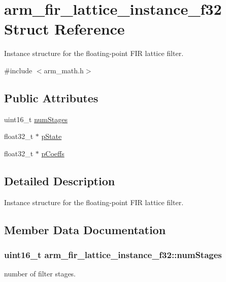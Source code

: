 \hypertarget{structarm__fir__lattice__instance__f32}{}\section{arm\+\_\+fir\+\_\+lattice\+\_\+instance\+\_\+f32 Struct Reference}
\label{structarm__fir__lattice__instance__f32}


Instance structure for the floating-\/point F\+IR lattice filter.  




{\ttfamily \#include $<$arm\+\_\+math.\+h$>$}

\subsection*{Public Attributes}
\begin{DoxyCompactItemize}
\item 
uint16\+\_\+t \hyperlink{structarm__fir__lattice__instance__f32_ad369bd9997a250f195254df37408a38f}{num\+Stages}
\item 
float32\+\_\+t $\ast$ \hyperlink{structarm__fir__lattice__instance__f32_ae348884a1ba9b83fadccd5da640cbcaf}{p\+State}
\item 
float32\+\_\+t $\ast$ \hyperlink{structarm__fir__lattice__instance__f32_a33bf5948c947f9ef80a99717cb0a0a43}{p\+Coeffs}
\end{DoxyCompactItemize}


\subsection{Detailed Description}
Instance structure for the floating-\/point F\+IR lattice filter. 

\subsection{Member Data Documentation}
\subsubsection[{\texorpdfstring{num\+Stages}{numStages}}]{\setlength{\rightskip}{0pt plus 5cm}uint16\+\_\+t arm\+\_\+fir\+\_\+lattice\+\_\+instance\+\_\+f32\+::num\+Stages}\hypertarget{structarm__fir__lattice__instance__f32_ad369bd9997a250f195254df37408a38f}{}\label{structarm__fir__lattice__instance__f32_ad369bd9997a250f195254df37408a38f}
number of filter stages. 
